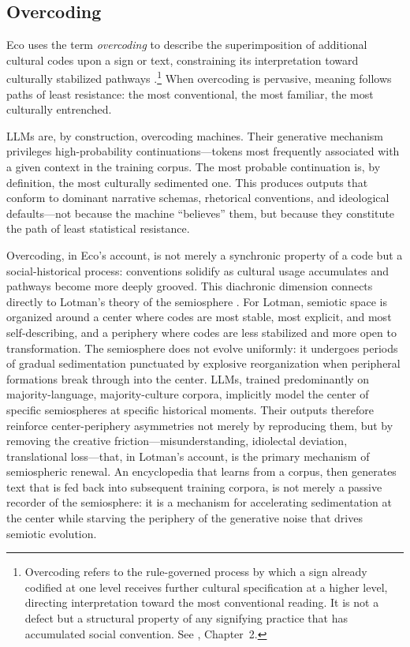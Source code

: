 \documentclass[12pt,a4paper]{article}
\begin{document}
\subsection{Overcoding}

Eco uses the term \emph{overcoding} to describe the superimposition of
additional cultural codes upon a sign or text, constraining its interpretation
toward culturally stabilized pathways \citep{Eco1976}.\footnote{Overcoding
refers to the rule-governed process by which a sign already codified at one
level receives further cultural specification at a higher level, directing
interpretation toward the most conventional reading. It is not a defect but
a structural property of any signifying practice that has accumulated social
convention. See \citet{Eco1976}, Chapter~2.} When overcoding is pervasive,
meaning follows paths of least resistance: the most conventional, the most
familiar, the most culturally entrenched.

LLMs are, by construction, overcoding machines. Their generative mechanism
privileges high-probability continuations---tokens most frequently associated
with a given context in the training corpus. The most probable continuation
is, by definition, the most culturally sedimented one. This produces outputs
that conform to dominant narrative schemas, rhetorical conventions, and
ideological defaults---not because the machine ``believes'' them, but because
they constitute the path of least statistical resistance.

Overcoding, in Eco's account, is not merely a synchronic property of a code
but a social-historical process: conventions solidify as cultural usage
accumulates and pathways become more deeply grooved. This diachronic dimension
connects directly to Lotman's theory of the semiosphere \citep{Lotman1990}.
For Lotman, semiotic space is organized around a center where codes are most
stable, most explicit, and most self-describing, and a periphery where codes
are less stabilized and more open to transformation. The semiosphere does not
evolve uniformly: it undergoes periods of gradual sedimentation punctuated by
explosive reorganization when peripheral formations break through into the
center. LLMs, trained predominantly on majority-language, majority-culture
corpora, implicitly model the center of specific semiospheres at specific
historical moments. Their outputs therefore reinforce center-periphery
asymmetries not merely by reproducing them, but by removing the creative
friction---misunderstanding, idiolectal deviation, translational loss---that,
in Lotman's account, is the primary mechanism of semiospheric renewal. An
encyclopedia that learns from a corpus, then generates text that is fed back
into subsequent training corpora, is not merely a passive recorder of the
semiosphere: it is a mechanism for accelerating sedimentation at the center
while starving the periphery of the generative noise that drives semiotic
evolution.
\end{document}
